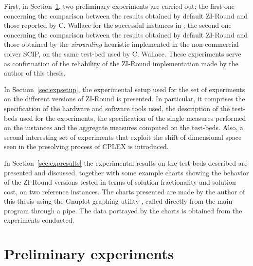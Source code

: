 \documentclass[a4paper,12pt,twoside]{scrbook}
\begin{document}
First, in Section~\ref{sec:preliminary-exp}, two preliminary experiments are carried out: the first one concerning the comparison between the results obtained by default ZI-Round and those reported by C. Wallace  for the successful instances in \cite{wallace2010}; the second one concerning the comparison between the results obtained by default ZI-Round and those obtained by the \textit{zirounding} heuristic implemented in the non-commercial solver SCIP, on the same test-bed used by C. Wallace. These experiments serve as confirmation of the reliability of the ZI-Round implementation made by the author of this thesis. \par

In Section~\ref{sec:expsetup}, the experimental setup used for the set of experiments on the different versions of ZI-Round is presented. In particular, it comprises the specification of the hardware and software tools used, the description of the test-beds used for the experiments, the specification of the single measures performed on the instances and the aggregate measures computed on the test-beds. Also, a second interesting set of experiments that exploit the shift of dimensional space seen in the presolving process of CPLEX is introduced. \par 

In Section~\ref{sec:expresults} the experimental results on the test-beds described are presented and discussed, together with some example charts showing the behavior of the ZI-Round versions tested in terms of solution fractionality and solution cost, on two reference instances. The charts presented are made by the author of this thesis using the Gnuplot graphing utility \cite{gnuplot}, called directly from the main program through a pipe. The data portrayed by the charts is obtained from the experiments conducted.

\section{Preliminary experiments} \label{sec:preliminary-exp}
\end{document}
